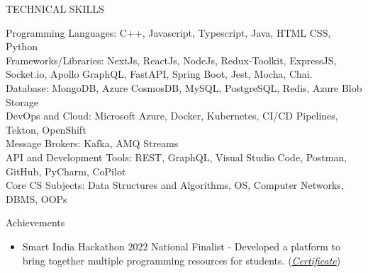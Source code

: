 \documentclass{resume} %
\begin{document}
\begin{rSection}{TECHNICAL SKILLS}




Programming Languages: {\normalfont C++, Javascript, Typescript, Java, HTML CSS, Python}
\\
Frameworks/Libraries: {\normalfont NextJs, ReactJs, NodeJs, Redux-Toolkit, ExpressJS,  Socket.io, Apollo GraphQL, FastAPI, Spring Boot, Jest, Mocha, Chai.}
 \\
 Database: {\normalfont MongoDB, Azure CosmosDB, MySQL, PostgreSQL, Redis, Azure Blob Storage}
 \\
 DevOps and Cloud: {\normalfont Microsoft Azure, Docker, Kubernetes, CI/CD Pipelines, Tekton, OpenShift}
 \\
 Message Brokers: {\normalfont Kafka, AMQ Streams}  
 \\
 API and Development Tools: {\normalfont REST, GraphQL, Visual Studio Code, Postman, GitHub, PyCharm, CoPilot}
 \\
 Core CS Subjects: {\normalfont Data Structures and Algorithms, OS, Computer Networks, DBMS, OOPs}

\end{rSection}


\begin{rSection}{Achievements}

\begin{itemize}
   \item {Smart India Hackathon 2022 National Finalist} - {\normalfont Developed a platform to bring together multiple programming resources for students. }{\normalfont (\href{https://drive.google.com/file/d/1No-u1sUaclG-nf7_Gtym5JDEz1ydyRSL/view?usp=sharing}{\emph{Certificate}})}

\end{itemize}
\end{rSection}





\end{document}
